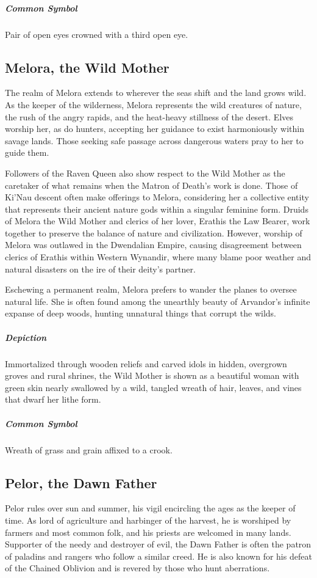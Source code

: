 \documentclass[letterpaper, twocolumn, openany, nodeprecatedcode, layout=true]{dndbook}
\begin{document}
\subparagraph{Common Symbol}
Pair of open eyes crowned with a third open eye.

\subsection{Melora, the Wild Mother}

The realm of Melora extends to wherever the seas shift and the land grows wild. As the
keeper of the wilderness, Melora represents the wild creatures of nature, the rush of the
angry rapids, and the heat-heavy stillness of the desert. Elves worship her, as do hunters,
accepting her guidance to exist harmoniously within savage lands. Those seeking safe passage
across dangerous waters pray to her to guide them.

Followers of the Raven Queen also show respect to the Wild Mother as the caretaker of
what remains when the Matron of Death’s work is done. Those of Ki’Nau descent often make
offerings to Melora, considering her a collective entity that represents their ancient nature
gods within a singular feminine form. Druids of Melora the Wild Mother and clerics of her
lover, Erathis the Law Bearer, work together to preserve the balance of nature and
civilization. However, worship of Melora was outlawed in the Dwendalian Empire, causing
disagreement between clerics of Erathis within Western Wynandir, where many blame poor
weather and natural disasters on the ire of their deity’s partner.

Eschewing a permanent realm, Melora prefers to wander the planes to oversee natural life.
She is often found among the unearthly beauty of Arvandor’s infinite expanse of deep woods,
hunting unnatural things that corrupt the wilds.

\subparagraph{Depiction}
Immortalized through wooden reliefs and carved idols in hidden, overgrown groves and rural
shrines, the Wild Mother is shown as a beautiful woman with green skin nearly swallowed by
a wild, tangled wreath of hair, leaves, and vines that dwarf her lithe form.

\subparagraph{Common Symbol}
Wreath of grass and grain affixed to a crook.

\subsection{Pelor, the Dawn Father}

Pelor rules over sun and summer, his vigil encircling the ages as the keeper of time. As
lord of agriculture and harbinger of the harvest, he is worshiped by farmers and most common
folk, and his priests are welcomed in many lands. Supporter of the needy and destroyer of
evil, the Dawn Father is often the patron of paladins and rangers who follow a similar creed.
He is also known for his defeat of the Chained Oblivion and is revered by those who
hunt aberrations.
\end{document}
